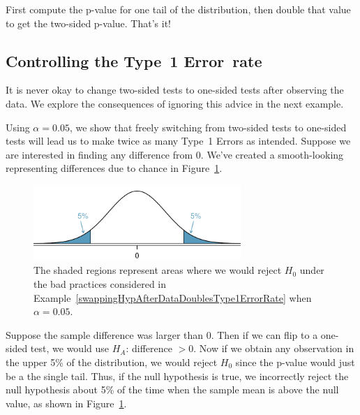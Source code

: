 \begin{termBox}{
First compute the p-value for one tail of the distribution, then double that value to get the two-sided p-value. That's it!}
\end{termBox}


\subsection{Controlling the Type~1 Error~rate}
\label{InflatingType1ErrorRate}

It is never okay to change two-sided tests to one-sided tests after observing the data. We explore the consequences of ignoring this advice in the next example.

\begin{example}{Using $\alpha=0.05$, we show that freely switching from two-sided tests to one-sided tests will lead us to make twice as many Type~1 Errors as intended.} \label{swappingHypAfterDataDoublesType1ErrorRate}
Suppose we are interested in finding any difference from 0. We've created a smooth-looking  representing differences due to chance in Figure~\ref{type1ErrorDoublingExampleFigure}.

\begin{figure}[h]
\centering
\includegraphics[width=0.7\textwidth]{02/figures/type1ErrorDoublingExampleFigure/type1ErrorDoublingExampleFigure}
\caption{The shaded regions represent areas where we would reject $H_0$ under the bad practices considered in Example~\ref{swappingHypAfterDataDoublesType1ErrorRate} when $\alpha = 0.05$.}
\label{type1ErrorDoublingExampleFigure}
\end{figure}

Suppose the sample difference was larger than 0. Then if we can flip to a one-sided test, we would use $H_A$: difference $> 0$. Now if we obtain any observation in the upper 5\% of the distribution, we would reject $H_0$ since the p-value would just be a the single tail. Thus, if the null hypothesis is true, we incorrectly reject the null hypothesis about 5\% of the time when the sample mean is above the null value, as shown in Figure~\ref{type1ErrorDoublingExampleFigure}.


\end{example}
